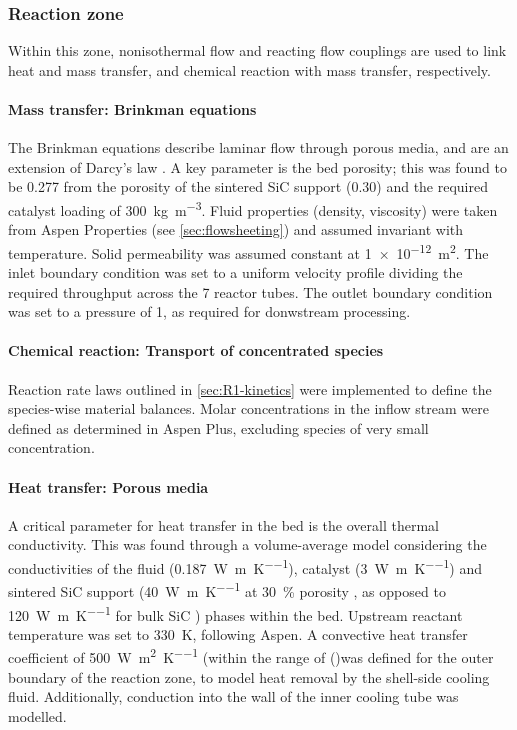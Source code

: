 \subsubsection{Reaction zone}
Within this zone, nonisothermal flow and reacting flow couplings are used to link heat and mass transfer, and chemical reaction with mass transfer, respectively.

\paragraph{Mass transfer: Brinkman equations}
The Brinkman equations describe laminar flow through porous media, and are an extension of Darcy's law \cite{comsol_cfd_2020}. A key parameter is the bed porosity; this was found to be \num{0.277} from the porosity of the sintered SiC support (0.30) and the required catalyst loading of \SI{300}{\kg\per\cubic\m}. Fluid properties (density, viscosity) were taken from Aspen Properties (see \cref{sec:flowsheeting}) and assumed invariant with temperature. Solid permeability was assumed constant at \SI{1e-12}{\square\m}. The inlet boundary condition was set to a uniform velocity profile dividing the required throughput across the 7 reactor tubes. The outlet boundary condition was set to a pressure of \SI{1}{\atm}, as required for donwstream processing.

\paragraph{Chemical reaction: Transport of concentrated species}
Reaction rate laws outlined in \cref{sec:R1-kinetics} were implemented to define the species-wise material balances. Molar concentrations in the inflow stream were defined as determined in Aspen Plus, excluding species of very small concentration.

\paragraph{Heat transfer: Porous media}
A critical parameter for heat transfer in the bed is the overall thermal conductivity. This was found through a volume-average model considering the conductivities of the fluid (\SI{0.187}{\W\per\m\per\K}), catalyst (\SI{3}{\W\per\m\per\K}) and sintered SiC support (\SI{40}{\W\per\m\per\K} at \SI{30}{\percent} porosity \cite{jang_thermophysical_2007}, as opposed to \SI{120}{\W\per\m\per\K} for bulk SiC \cite{accuratus_silicon_2013}) phases within the bed. Upstream reactant temperature was set to \SI{330}{\K}, following Aspen. A convective heat transfer coefficient of \SI{500}{\W\per\square\m\per\K} (within the range of ()was defined for the outer boundary of the reaction zone, to model heat removal by the shell-side cooling fluid. Additionally, conduction into the wall of the inner cooling tube was modelled.

